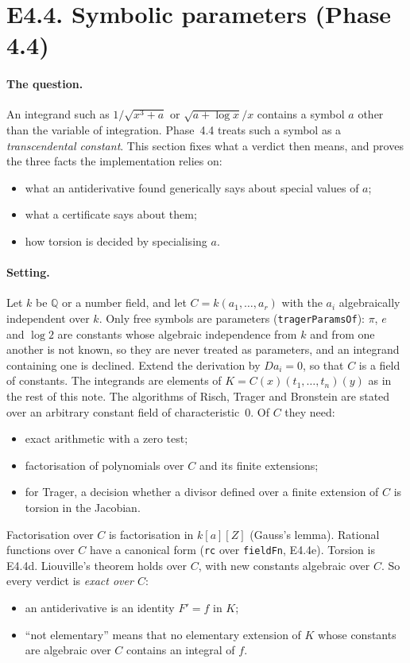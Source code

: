 \documentclass[11pt]{article}
\theoremstyle{definition}
\theoremstyle{remark}
\newcommand{\Q}{\mathbb{Q}}
\newcommand{\code}[1]{\texttt{#1}}
\begin{document}
\section*{E4.4. Symbolic parameters (Phase 4.4)}

\paragraph{The question.} An integrand such as $1/\sqrt{x^3+a}$ or $\sqrt{a+\log x}/x$
contains a symbol $a$ other than the variable of integration. Phase~4.4 treats such a
symbol as a \emph{transcendental constant}. This section fixes what a verdict then
means, and proves the three facts the implementation relies on:
\begin{itemize}
\item what an antiderivative found generically says about special values of $a$;
\item what a certificate says about them;
\item how torsion is decided by specialising $a$.
\end{itemize}

\paragraph{Setting.} Let $k$ be $\Q$ or a number field, and let
$C=k(a_1,\dots,a_r)$ with the $a_i$ algebraically independent over $k$. Only free
symbols are parameters (\code{tragerParamsOf}): $\pi$, $e$ and $\log 2$ are constants
whose algebraic independence from $k$ and from one another is not known, so they are
never treated as parameters, and an integrand containing one is declined. Extend the
derivation by $Da_i=0$, so that $C$ is a field of constants. The integrands are elements
of $K=C(x)(t_1,\dots,t_n)(y)$ as in the rest of this note. The algorithms of Risch,
Trager and Bronstein are stated over an arbitrary constant field of characteristic~0.
Of $C$ they need:
\begin{itemize}
\item exact arithmetic with a zero test;
\item factorisation of polynomials over $C$ and its finite extensions;
\item for Trager, a decision whether a divisor defined over a finite extension of $C$ is
  torsion in the Jacobian.
\end{itemize}
Factorisation over $C$ is factorisation in $k[a][Z]$ (Gauss's lemma). Rational functions
over $C$ have a canonical form (\code{rc} over \code{fieldFn}, E4.4e). Torsion is
E4.4d. Liouville's theorem holds over $C$, with new constants algebraic over $C$. So
every verdict is \emph{exact over $C$}:
\begin{itemize}
\item an antiderivative is an identity $F'=f$ in $K$;
\item ``not elementary'' means that no elementary extension of $K$ whose constants are
  algebraic over $C$ contains an integral of $f$.
\end{itemize}
\end{document}
